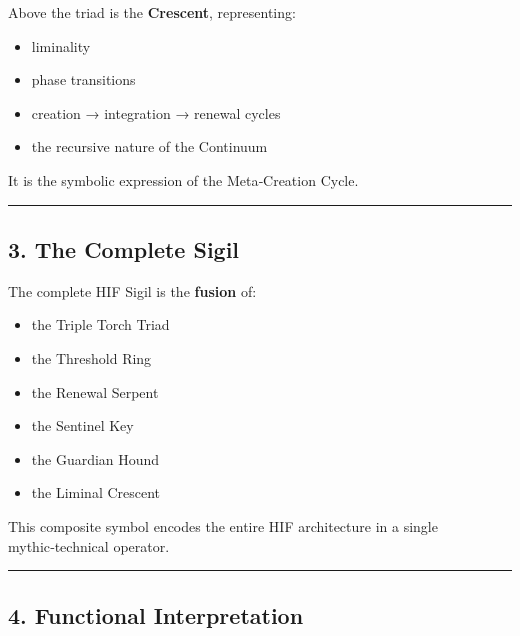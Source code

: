 Above the triad is the \textbf{Crescent}, representing:

\begin{itemize}
\tightlist
\item
  liminality\\
\item
  phase transitions\\
\item
  creation → integration → renewal cycles\\
\item
  the recursive nature of the Continuum
\end{itemize}

It is the symbolic expression of the Meta‑Creation Cycle.

\begin{center}\rule{0.5\linewidth}{0.5pt}\end{center}

\subsection{3. The Complete Sigil}\label{the-complete-sigil}

The complete HIF Sigil is the \textbf{fusion} of:

\begin{itemize}
\tightlist
\item
  the Triple Torch Triad\\
\item
  the Threshold Ring\\
\item
  the Renewal Serpent\\
\item
  the Sentinel Key\\
\item
  the Guardian Hound\\
\item
  the Liminal Crescent
\end{itemize}

This composite symbol encodes the entire HIF architecture in a single mythic‑technical operator.

\begin{center}\rule{0.5\linewidth}{0.5pt}\end{center}

\subsection{4. Functional Interpretation}\label{functional-interpretation}

